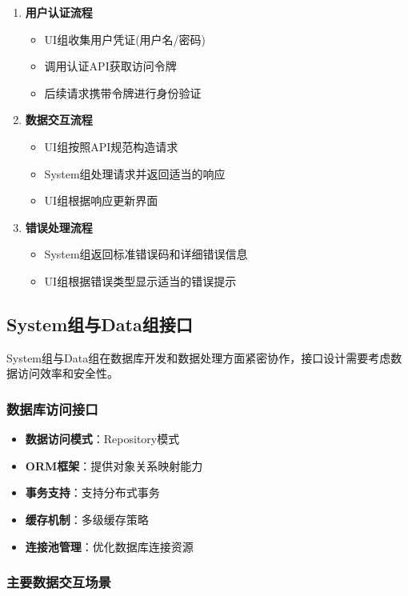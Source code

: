 \documentclass[a4paper,12pt]{article}
\begin{document}
\begin{enumerate}
  \item \textbf{用户认证流程}
  \begin{itemize}
    \item UI组收集用户凭证(用户名/密码)
    \item 调用认证API获取访问令牌
    \item 后续请求携带令牌进行身份验证
  \end{itemize}
  
  \item \textbf{数据交互流程}
  \begin{itemize}
    \item UI组按照API规范构造请求
    \item System组处理请求并返回适当的响应
    \item UI组根据响应更新界面
  \end{itemize}
  
  \item \textbf{错误处理流程}
  \begin{itemize}
    \item System组返回标准错误码和详细错误信息
    \item UI组根据错误类型显示适当的错误提示
  \end{itemize}
\end{enumerate}

\subsection{System组与Data组接口}

System组与Data组在数据库开发和数据处理方面紧密协作，接口设计需要考虑数据访问效率和安全性。

\subsubsection{数据库访问接口}

\begin{itemize}
  \item \textbf{数据访问模式}：Repository模式
  \item \textbf{ORM框架}：提供对象关系映射能力
  \item \textbf{事务支持}：支持分布式事务
  \item \textbf{缓存机制}：多级缓存策略
  \item \textbf{连接池管理}：优化数据库连接资源
\end{itemize}

\subsubsection{主要数据交互场景}
\end{document}
